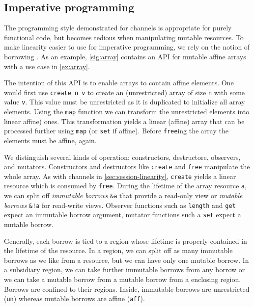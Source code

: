 
\subsection{Imperative programming}
\label{sec:imper-progr}

The programming style demonstrated for channels is
appropriate for purely functional code, but becomes tedious when
manipulating mutable resources.
%
To make linearity easier to use for imperative programming, we rely on
the notion of borrowing \cite{DBLP:conf/popl/BoylandR05}. As an example,
\cref{sig:array} contains an API for mutable affine arrays with a use case in \cref{ex:array}. 

The intention of this API is to enable arrays to contain affine
elements. One would first use \lstinline/create n v/ to create
an (unrestricted) array of size \lstinline/n/ with some value
\lstinline/v/. This value must be unrestricted as it is duplicated to
initialize all array elements. Using the \lstinline/map/ function we
can transform the unrestricted elements into linear affine)
ones. This transformation yields a linear (affine) array that can be
processed further using \lstinline/map/ (or \lstinline/set/ if
affine). Before \lstinline/free/ing the array the elements must be
affine, again. 

We distinguish several kinds of operation: constructors, destructore,
observers, and mutators. 
Constructors and destructors like \lstinline/create/ and \lstinline/free/ manipulate the whole
array. As with channels in \cref{sec:session-linearity},
\lstinline/create/ yields a linear resource which is consumed by \lstinline/free/.
During the lifetime of the array resource \lstinline/a/, we can split
off \emph{immutable borrows} \lstinline/&a/ that provide a read-only
view or \emph{mutable borrows} \lstinline/&!a/ for read-write views.
Observer functions such as \lstinline/length/ and \lstinline/get/ expect an immutable borrow
argument, mutator functions such a \lstinline/set/ expect
a mutable borrow.

Generally, each borrow is tied to a region whose lifetime is properly
contained in the lifetime of the resource. 
In a region, we can split off as many immutable borrows as we like
from a resource, but we can have only one mutable borrow. In a
subsidiary region, we can take further immutable borrows from any
borrow or we can take a mutable borrow from a mutable borrow from a
enclosing region. Borrows are confined to their regions. Inside,
immutable borrows are unrestricted (\lstinline/un/) whereas mutable
borrows are affine (\lstinline/aff/).

